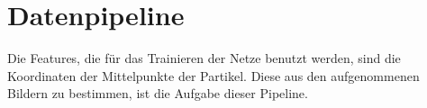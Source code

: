 \section{Datenpipeline} \label{sec:pipeline}


Die Features, die für das Trainieren der Netze benutzt werden, sind die Koordinaten der Mittelpunkte der Partikel.
Diese aus den aufgenommenen Bildern zu bestimmen, ist die Aufgabe dieser Pipeline.

